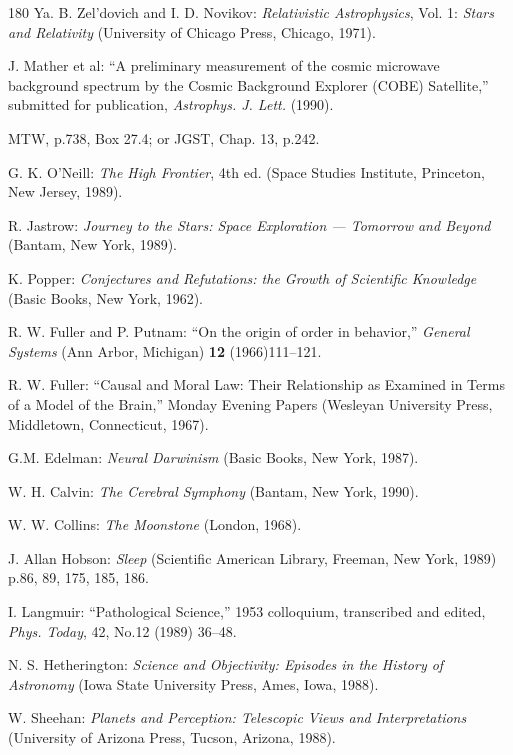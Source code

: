 \documentclass[11pt]{article}
\begin{document}
\begin{thebibliography}{180}
		Ya. B. Zel'dovich and I. D. Novikov: \emph{Relativistic Astrophysics}, Vol. 1: \emph{Stars and Relativity} (University of Chicago Press, Chicago, 1971).
		
		J. Mather et al: ``A preliminary measurement of the cosmic microwave background spectrum by the Cosmic Background Explorer (COBE) Satellite,'' submitted for publication, \emph{Astrophys. J. Lett.} (1990).
		
		MTW, p.738, Box 27.4; or JGST, Chap. 13, p.242.
		
		G. K. O'Neill: \emph{The High Frontier}, 4th ed. (Space Studies Institute, Princeton, New Jersey, 1989).
		
		R. Jastrow: \emph{Journey to the Stars: Space Exploration --- Tomorrow and Beyond} (Bantam, New York, 1989).
		
		K. Popper: \emph{Conjectures and Refutations: the Growth of Scientific Knowledge} (Basic Books, New York, 1962).
		
		R. W. Fuller and P. Putnam: ``On the origin of order in behavior,'' \emph{General Systems} (Ann Arbor, Michigan) \textbf{12} (1966)111--121.
		
		R. W. Fuller: ``Causal and Moral Law: Their Relationship as Examined in Terms of a Model of the Brain,'' Monday Evening Papers (Wesleyan University Press, Middletown, Connecticut, 1967).
		
		G.M. Edelman: \emph{Neural Darwinism} (Basic Books, New York, 1987).
		
		W. H. Calvin: \emph{The Cerebral Symphony} (Bantam, New York, 1990).
		
		W. W. Collins: \emph{The Moonstone} (London, 1968).
		
		J. Allan Hobson: \emph{Sleep} (Scientific American Library, Freeman, New York, 1989) p.86, 89, 175, 185, 186.
		
		I. Langmuir: ``Pathological Science,'' 1953 colloquium, transcribed and edited, \emph{Phys. Today}, 42, No.12 (1989) 36--48.
		
		N. S. Hetherington: \emph{Science and Objectivity: Episodes in the History of Astronomy} (Iowa State University Press, Ames, Iowa, 1988).
		
		W. Sheehan: \emph{Planets and Perception: Telescopic Views and Interpretations} (University of Arizona Press, Tucson, Arizona, 1988).
		

\end{thebibliography}
\end{document}
